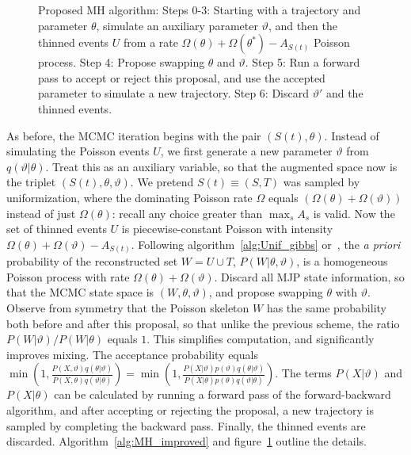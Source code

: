 \begin{figure}[h!]
\begin{minipage}[hp]{0.45\linewidth}
  \end{minipage}
    \caption{Proposed MH algorithm: Steps 0-3: Starting with a trajectory and parameter $\theta$, simulate an auxiliary parameter $\vartheta$, and then the thinned events
      $U$ from a rate $\Omega(\theta) + \Omega(\theta^*) - A_{S(t)}$ Poisson
      process. Step 4: Propose swapping $\theta$ and $\vartheta$. Step 5:
      Run a forward pass to accept or reject this proposal, and use the accepted
    parameter to simulate a new trajectory. Step 6: Discard $\vartheta'$ and the thinned events.} 
   \label{fig:MH_improved}
  \end{figure}
As before, the MCMC iteration begins with the pair $(S(t), \theta)$. 
Instead of simulating the Poisson events $U$, we first generate a new 
parameter $\vartheta$ from $q(\vartheta|\theta)$. Treat this as an 
auxiliary variable, so that the augmented space now is the triplet 
$(S(t), \theta,\vartheta)$. We pretend $S(t) \equiv (S,T)$ was sampled by  
uniformization, where the dominating Poisson rate $\Omega$ equals 
$(\Omega(\theta) + \Omega(\vartheta))$ instead of just $\Omega(\theta)$:
recall any choice greater than $\max_s A_s$ is valid.
Now the set of thinned events $U$ is piecewise-constant
Poisson with intensity $\Omega(\theta) + \Omega(\vartheta) - 
A_{S(t)}$. Following algorithm~\ref{alg:Unif_gibbs} or~\cite{RaoTeh13}, 
the {\em a priori} probability of the reconstructed set $W = U \cup T$, 
$P(W|\theta,\vartheta)$, is a homogeneous Poisson 
process with rate $\Omega(\theta) + \Omega(\vartheta)$. Discard all 
MJP state information, so that the MCMC state space is $(W, \theta, \vartheta)$,
and propose swapping $\theta$ with $\vartheta$. 
Observe from
symmetry that the Poisson skeleton $W$ has the same probability both
before and after this proposal, so that unlike the previous scheme,
the ratio $P(W|\vartheta)/P(W|\theta)$ equals $1$.  This simplifies 
computation, and significantly improves mixing.
The acceptance probability 
equals
$ 
  \min\left(1, \frac{P(X,\vartheta)q(\theta|\vartheta)}
   {P(X,\theta)q(\vartheta|\theta)}\right) = 
  \min\left(1, \frac{P(X|\vartheta)p(\vartheta)q(\theta|\vartheta)}
   {P(X|\theta)p(\theta)q(\vartheta|\theta)}\right).
   $
   The terms $P(X|\vartheta)$ and  $P(X|\theta)$ can be calculated by 
   running a forward pass of the forward-backward algorithm, and after
   accepting or rejecting the proposal, a new trajectory is sampled by
   completing the backward pass. Finally, the thinned events are
   discarded. Algorithm~\ref{alg:MH_improved} and 
   figure~\ref{fig:MH_improved} outline the details. 

